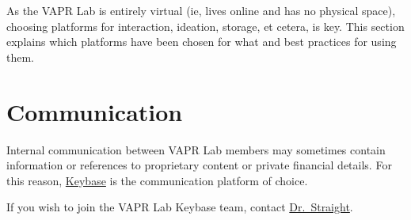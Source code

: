 \documentclass[12pt,]{memoir}
\begin{document}
As the VAPR Lab is entirely virtual (ie, lives online and has no physical space), choosing platforms for interaction, ideation, storage, et cetera, is key. This section explains which platforms have been chosen for what and best practices for using them.

\hypertarget{communication}{%
\section{Communication}\label{communication}}

Internal communication between VAPR Lab members may sometimes contain information or references to proprietary content or private financial details. For this reason, \href{https://keybase.io}{Keybase} is the communication platform of choice.

If you wish to join the VAPR Lab Keybase team, contact \href{https://keybase.io/ryanstraight}{Dr.~Straight}.


\end{document}
